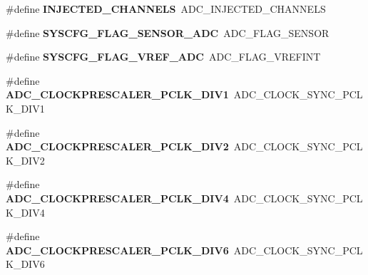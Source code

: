 \begin{DoxyCompactItemize}
\#define {\bfseries I\+N\+J\+E\+C\+T\+E\+D\+\_\+\+C\+H\+A\+N\+N\+E\+LS}~A\+D\+C\+\_\+\+I\+N\+J\+E\+C\+T\+E\+D\+\_\+\+C\+H\+A\+N\+N\+E\+LS
\item 
\mbox{\label{group___h_a_l___a_d_c___aliased___defines_ga48929ac8156ee0ea52c25ad3ec9fed11}} 
\#define {\bfseries S\+Y\+S\+C\+F\+G\+\_\+\+F\+L\+A\+G\+\_\+\+S\+E\+N\+S\+O\+R\+\_\+\+A\+DC}~A\+D\+C\+\_\+\+F\+L\+A\+G\+\_\+\+S\+E\+N\+S\+OR
\item 
\mbox{\label{group___h_a_l___a_d_c___aliased___defines_gaa7f5151463037ce60032a869f3e71665}} 
\#define {\bfseries S\+Y\+S\+C\+F\+G\+\_\+\+F\+L\+A\+G\+\_\+\+V\+R\+E\+F\+\_\+\+A\+DC}~A\+D\+C\+\_\+\+F\+L\+A\+G\+\_\+\+V\+R\+E\+F\+I\+NT
\item 
\mbox{\label{group___h_a_l___a_d_c___aliased___defines_gaaf80e00044e185957328f1d59bacdf37}} 
\#define {\bfseries A\+D\+C\+\_\+\+C\+L\+O\+C\+K\+P\+R\+E\+S\+C\+A\+L\+E\+R\+\_\+\+P\+C\+L\+K\+\_\+\+D\+I\+V1}~A\+D\+C\+\_\+\+C\+L\+O\+C\+K\+\_\+\+S\+Y\+N\+C\+\_\+\+P\+C\+L\+K\+\_\+\+D\+I\+V1
\item 
\mbox{\label{group___h_a_l___a_d_c___aliased___defines_ga058aa1143f9f7f123362039c9efcf4cb}} 
\#define {\bfseries A\+D\+C\+\_\+\+C\+L\+O\+C\+K\+P\+R\+E\+S\+C\+A\+L\+E\+R\+\_\+\+P\+C\+L\+K\+\_\+\+D\+I\+V2}~A\+D\+C\+\_\+\+C\+L\+O\+C\+K\+\_\+\+S\+Y\+N\+C\+\_\+\+P\+C\+L\+K\+\_\+\+D\+I\+V2
\item 
\mbox{\label{group___h_a_l___a_d_c___aliased___defines_ga98bc3d5a9f7e069183a205c8458a6645}} 
\#define {\bfseries A\+D\+C\+\_\+\+C\+L\+O\+C\+K\+P\+R\+E\+S\+C\+A\+L\+E\+R\+\_\+\+P\+C\+L\+K\+\_\+\+D\+I\+V4}~A\+D\+C\+\_\+\+C\+L\+O\+C\+K\+\_\+\+S\+Y\+N\+C\+\_\+\+P\+C\+L\+K\+\_\+\+D\+I\+V4
\item 
\mbox{\label{group___h_a_l___a_d_c___aliased___defines_gae5cbf680825b9ccaa02bdbab9217f550}} 
\#define {\bfseries A\+D\+C\+\_\+\+C\+L\+O\+C\+K\+P\+R\+E\+S\+C\+A\+L\+E\+R\+\_\+\+P\+C\+L\+K\+\_\+\+D\+I\+V6}~A\+D\+C\+\_\+\+C\+L\+O\+C\+K\+\_\+\+S\+Y\+N\+C\+\_\+\+P\+C\+L\+K\+\_\+\+D\+I\+V6
\item 

\end{DoxyCompactItemize}
